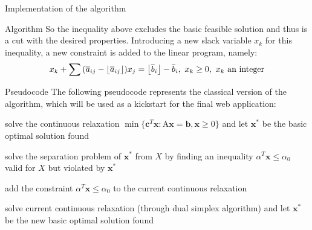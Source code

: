 \documentclass[9pt]{extarticle}
\DeclarePairedDelimiter\floor{\lfloor}{\rfloor}
\begin{document}
\begin{section}{Implementation of the algorithm}
\begin{subsection}{Algorithm}
            So the inequality above excludes the basic feasible solution and thus is a cut with the desired properties. 
            Introducing a new slack variable $x_k$ for this inequality, a new constraint is added to the linear program, namely:
            \begin{equation*}
                x_k + \sum{
                    (\overline{a}_{ij} - \floor*{
                        \overline{a}_{ij}
                    })x_j = \floor*{
                        \overline{b}_i
                     } - \overline{b}_i,\ x_k \ge 0,\ x_k \ \text{an integer}
                }
            \end{equation*}
        \end{subsection}

        \begin{subsection}{Pseudocode}
            The following pseudocode\cite{book} represents the classical version of the algorithm, which will be used as a kickstart
            for the final web application:
            \vspace{10px}

            \begin{algorithm}
                \caption{Cutting Plane Algorithm}\label{alg:cuttingplane}
                \begin{algorithmic}[1]
                        \State \parbox[t]{.8\linewidth}{%
                            solve the continuous relaxation 
                            $\min\{\mathbf{c}^{T}\mathbf{x} : \text{A}\mathbf{x} = \mathbf{b}, \mathbf{x} \ge 0\}$
                            and let $\mathbf{x^*}$ be the basic optimal solution found
                        }
                            \State \parbox[t]{.8\linewidth}{%
                                solve the separation problem of $\mathbf{x^*}$ from $X$ by finding an inequality
                                $\alpha^{T}\mathbf{x} \leq \alpha_0$ valid for $X$ but violated by $\mathbf{x^*}$
                            }
                            \State add the constraint $\alpha^{T}\mathbf{x} \leq \alpha_0$ to the current continuous relaxation
                            \State \parbox[t]{.8\linewidth}{%
                                solve current continuous relaxation (through dual simplex algorithm) and let $\mathbf{x^*}$ 
                                be the new basic optimal solution found
                            }
                        \EndWhile
                    \EndProcedure
                \end{algorithmic}   
            \end{algorithm}    
            \vspace{10px}     
        \end{subsection}
    \end{section}
\end{document}
